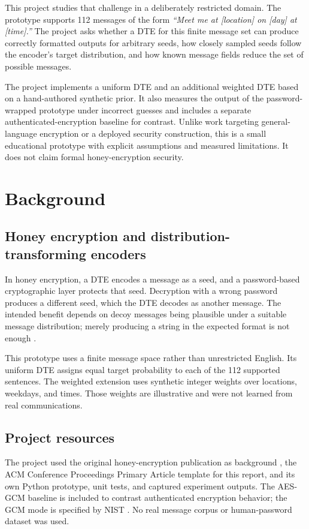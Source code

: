 \documentclass[sigconf,nonacm]{acmart}
\begin{document}
This project studies that challenge in a deliberately restricted domain. The
prototype supports 112 messages of the form
\emph{``Meet me at [location] on [day] at [time].''} The project asks whether
a DTE for this finite message set can produce correctly formatted outputs for
arbitrary seeds, how closely sampled seeds follow the encoder's target
distribution, and how known message fields reduce the set of possible
messages.

The project implements a uniform DTE and an additional weighted DTE based on
a hand-authored synthetic prior. It also measures the output of the
password-wrapped prototype under incorrect guesses and includes a separate
authenticated-encryption baseline for contrast. Unlike work targeting
general-language encryption or a deployed security construction, this is a
small educational prototype with explicit assumptions and measured
limitations. It does not claim formal honey-encryption security.

\section{Background}
\label{sec:background}

\subsection{Honey encryption and distribution-transforming encoders}

In honey encryption, a DTE encodes a message as a seed, and a password-based
cryptographic layer protects that seed. Decryption with a wrong password
produces a different seed, which the DTE decodes as another message. The
intended benefit depends on decoy messages being plausible under a suitable
message distribution; merely producing a string in the expected format is
not enough \cite{juels2014honey}.

This prototype uses a finite message space rather than unrestricted English.
Its uniform DTE assigns equal target probability to each of the 112 supported
sentences. The weighted extension uses synthetic integer weights over
locations, weekdays, and times. Those weights are illustrative and were not
learned from real communications.

\subsection{Project resources}

The project used the original honey-encryption publication as background
\cite{juels2014honey}, the ACM Conference Proceedings Primary Article
template for this report, and its own Python prototype, unit tests, and
captured experiment outputs. The AES-GCM baseline is included to contrast
authenticated encryption behavior; the GCM mode is specified by NIST
\cite{nist2007gcm}. No real message corpus or human-password dataset was used.
\end{document}
